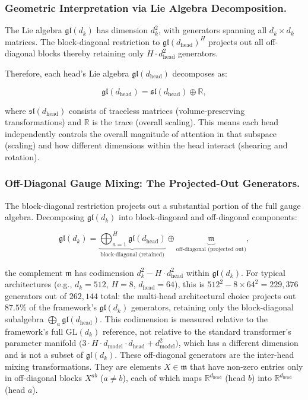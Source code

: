 \documentclass[twoside,11pt]{article}
\begin{document}
\subsubsection{Geometric Interpretation via Lie Algebra Decomposition.}

The Lie algebra $\mathfrak{gl}(d_k)$ has dimension $d_k^2$, with generators spanning all $d_k \times d_k$ matrices. The block-diagonal restriction to $\mathfrak{gl}(d_{\text{head}})^H$ projects out all off-diagonal blocks thereby retaining only $H \cdot d_{\text{head}}^2$ generators.

Therefore, each head's Lie algebra $\mathfrak{gl}(d_{\text{head}})$ decomposes as:

\begin{equation}
\mathfrak{gl}(d_{\text{head}}) = \mathfrak{sl}(d_{\text{head}}) \oplus \mathbb{R},
\end{equation}

where $\mathfrak{sl}(d_{\text{head}})$ consists of traceless matrices (volume-preserving transformations) and $\mathbb{R}$ is the trace (overall scaling). This means each head independently controls the overall magnitude of attention in that subspace (scaling) and how different dimensions within the head interact (shearing and rotation).

\subsubsection{Off-Diagonal Gauge Mixing: The Projected-Out Generators.}
\label{sec:off_diagonal_mixing}

The block-diagonal restriction projects out a substantial portion of the full gauge algebra. Decomposing $\mathfrak{gl}(d_k)$ into block-diagonal and off-diagonal components:

\begin{equation}
\mathfrak{gl}(d_k) = \underbrace{\bigoplus_{a=1}^{H} \mathfrak{gl}(d_{\text{head}})}_{\text{block-diagonal (retained)}} \oplus \underbrace{\mathfrak{m}}_{\text{off-diagonal (projected out)}},
\label{eq:lie_algebra_decomposition}
\end{equation}

the complement $\mathfrak{m}$ has codimension $d_k^2 - H \cdot d_{\text{head}}^2$ within $\mathfrak{gl}(d_k)$. For typical architectures (e.g., $d_k = 512$, $H = 8$, $d_{\text{head}} = 64$), this is $512^2 - 8 \times 64^2 = 229{,}376$ generators out of $262{,}144$ total: the multi-head architectural choice projects out $87.5\%$ of the framework's $\mathfrak{gl}(d_k)$ generators, retaining only the block-diagonal subalgebra $\bigoplus_a \mathfrak{gl}(d_{\text{head}})$. This codimension is measured relative to the framework's full $\mathrm{GL}(d_k)$ reference, not relative to the standard transformer's parameter manifold $\big(3 \cdot H \cdot d_{\text{model}} \cdot d_{\text{head}} + d_{\text{model}}^2\big)$, which has a different dimension and is not a subset of $\mathfrak{gl}(d_k)$. These off-diagonal generators are the inter-head mixing transformations. They are elements $X \in \mathfrak{m}$ that have non-zero entries only in off-diagonal blocks $X^{ab}$ ($a \neq b$), each of which maps $\mathbb{R}^{d_{\text{head}}}$ (head $b$) into $\mathbb{R}^{d_{\text{head}}}$ (head $a$).
\end{document}
